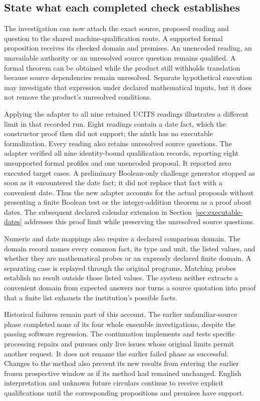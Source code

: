 \subsection{State what each completed check establishes}

The investigation can now attach the exact source, proposed reading and
question to the shared machine-qualification route. A supported formal
proposition receives its checked domain and premises. An unencoded reading, an
unavailable authority or an unresolved source question remains qualified. A
formal theorem can be obtained while the product still withholds translation
because source dependencies remain unresolved. Separate hypothetical execution
may investigate that expression under declared mathematical inputs, but it
does not remove the product's unresolved conditions.

Applying the adapter to all nine retained UCITS readings illustrates a different
limit in that recorded run. Eight readings contain a date fact, which the
constructor proof then did not support; the ninth has no executable formalization. Every reading also
retains unresolved source questions. The adapter verified all nine identity-bound
qualification records, reporting eight unsupported formal profiles and one
unencoded proposal. It reported zero executed target cases. A preliminary
Boolean-only challenge generator stopped as soon as it encountered the date
fact; it did not replace that fact with a convenient date. Thus the new adapter
accounts for the actual proposals without presenting a finite Boolean test or
the integer-addition theorem as a proof about dates. The subsequent declared
calendar extension in Section~\ref{sec:executable-dates} addresses this proof
limit while preserving the unresolved source questions.

Numeric and date mappings also require a declared comparison domain. The
domain record names every common fact, its type and unit, the listed values,
and whether they are mathematical probes or an expressly declared finite
domain. A separating case is replayed through the original programs. Matching
probes establish no result outside those listed values. The system neither
extracts a convenient domain from expected answers nor turns a source quotation
into proof that a finite list exhausts the institution's possible facts.

Historical failures remain part of this account. The earlier unfamiliar-source
phase completed none of its four whole ensemble investigations, despite the
passing software regression. The continuation implements and tests specific
processing repairs and pursues only live issues whose original limits permit
another request. It does not rename the earlier failed phase as successful.
Changes to the method also prevent its new results from entering the earlier
frozen prospective window as if its method had remained unchanged. English
interpretation and unknown future circulars continue to receive explicit
qualifications until the corresponding propositions and premises have support.

